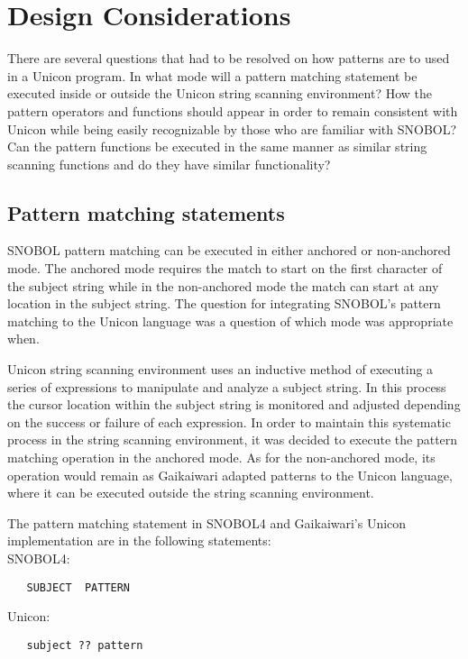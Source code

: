 \documentclass{article}
\begin{document}
\section{Design Considerations}

There are several questions that had to be resolved on how patterns are to used in a Unicon program.  In what mode will a pattern matching statement be executed inside or outside the Unicon string scanning environment?  How the pattern operators and functions should appear in order to remain consistent with Unicon while being easily recognizable by those who are familiar with SNOBOL?  Can the pattern functions be executed in the same manner as similar string scanning functions and do they have similar functionality?

\subsection{Pattern matching statements}
SNOBOL pattern matching can be executed in either anchored or non-anchored mode.  The anchored mode requires the match to start on the first character of the subject string while in the non-anchored mode the match can start at any location in the subject string.\cite{Snobol}  The question for integrating SNOBOL's pattern matching to the Unicon language was a question of which mode was appropriate when.

Unicon string scanning environment uses an inductive method of executing a series of expressions to manipulate and analyze a subject string.  In this process the cursor location within the subject string is monitored and adjusted depending on the success or failure of each expression.  In order to maintain this systematic process in the string scanning environment, it was decided to execute the pattern matching operation in the anchored mode.  As for the non-anchored mode, its operation would remain as Gaikaiwari adapted patterns to the Unicon language, where it can be executed outside the string scanning environment.  

The pattern matching statement in SNOBOL4 and Gaikaiwari's Unicon implementation are in the following statements:\\

\noindent
SNOBOL4:
\begin{verbatim}
   SUBJECT  PATTERN
\end{verbatim}
\noindent
Unicon:
\begin{verbatim}
   subject ?? pattern
\end{verbatim}
\end{document}
